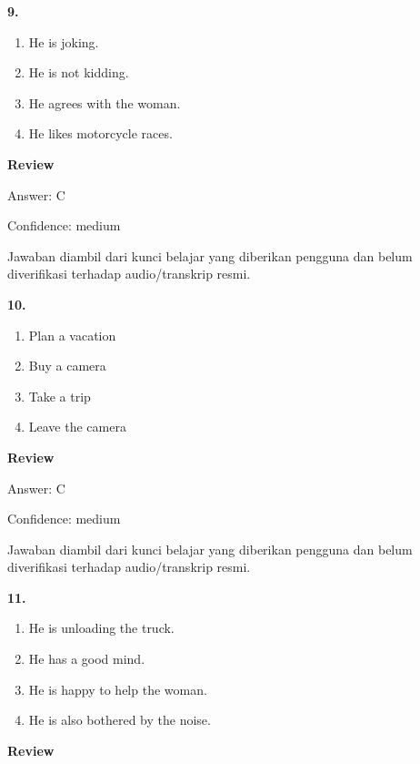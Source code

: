 \documentclass[12pt]{article}
\begin{document}
\noindent\textbf{9.}
\begin{enumerate}[label=(\Alph*),leftmargin=*,itemsep=0.2em]
\item He is joking.
\item He is not kidding.
\item He agrees with the woman.
\item He likes motorcycle races.
\end{enumerate}
\par
\begingroup
\setlength{\parskip}{0pt}
\setlength{\parindent}{0pt}
\textbf{Review}\par
Answer: C\par
Confidence: medium\par
Jawaban diambil dari kunci belajar yang diberikan pengguna dan belum diverifikasi terhadap audio/transkrip resmi.\par
\endgroup
\par
\vspace{0.25\baselineskip}
\noindent\textbf{10.}
\begin{enumerate}[label=(\Alph*),leftmargin=*,itemsep=0.2em]
\item Plan a vacation
\item Buy a camera
\item Take a trip
\item Leave the camera
\end{enumerate}
\par
\begingroup
\setlength{\parskip}{0pt}
\setlength{\parindent}{0pt}
\textbf{Review}\par
Answer: C\par
Confidence: medium\par
Jawaban diambil dari kunci belajar yang diberikan pengguna dan belum diverifikasi terhadap audio/transkrip resmi.\par
\endgroup
\par
\vspace{0.25\baselineskip}
\noindent\textbf{11.}
\begin{enumerate}[label=(\Alph*),leftmargin=*,itemsep=0.2em]
\item He is unloading the truck.
\item He has a good mind.
\item He is happy to help the woman.
\item He is also bothered by the noise.
\end{enumerate}
\par
\begingroup
\setlength{\parskip}{0pt}
\setlength{\parindent}{0pt}
\textbf{Review}\par
\end{document}

